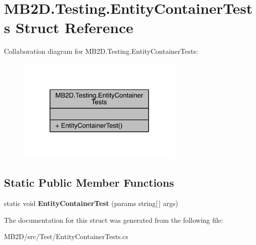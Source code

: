 \hypertarget{struct_m_b2_d_1_1_testing_1_1_entity_container_tests}{}\section{M\+B2\+D.\+Testing.\+Entity\+Container\+Tests Struct Reference}
\label{struct_m_b2_d_1_1_testing_1_1_entity_container_tests}


Collaboration diagram for M\+B2\+D.\+Testing.\+Entity\+Container\+Tests\+:\nopagebreak
\begin{figure}[H]
\begin{center}
\leavevmode
\includegraphics[width=229pt]{struct_m_b2_d_1_1_testing_1_1_entity_container_tests__coll__graph}
\end{center}
\end{figure}
\subsection*{Static Public Member Functions}
\begin{DoxyCompactItemize}
\item 
\hypertarget{struct_m_b2_d_1_1_testing_1_1_entity_container_tests_a745b6bc43f1feb392b1e835ee86acac0}{}\label{struct_m_b2_d_1_1_testing_1_1_entity_container_tests_a745b6bc43f1feb392b1e835ee86acac0} 
static void {\bfseries Entity\+Container\+Test} (params string\mbox{[}$\,$\mbox{]} args)
\end{DoxyCompactItemize}


The documentation for this struct was generated from the following file\+:\begin{DoxyCompactItemize}
\item 
M\+B2\+D/src/\+Test/Entity\+Container\+Tests.\+cs\end{DoxyCompactItemize}
